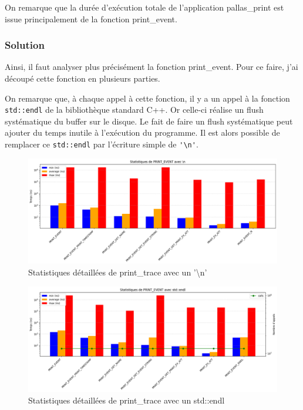 On remarque que la durée d'exécution totale de l'application pallas\_print est issue principalement de la fonction print\_event.

\subsubsection{Solution}\label{ssec:pallas_print_sol}

Ainsi, il faut analyser plus précisément la fonction print\_event.
Pour ce faire, j'ai découpé cette fonction en plusieurs parties. 

On remarque que, à chaque appel à cette fonction, il y a un appel à la fonction \verb!std::endl! de la bibliothèque standard C++. Or celle-ci réalise un flush systématique du buffer sur le disque.
Le fait de faire un flush systématique peut ajouter du temps inutile à l'exécution du programme.
Il est alors possible de remplacer ce \verb!std::endl! par l'écriture simple de \verb!'\n'!.


\begin{figure}[!h]
    \centering
    \includegraphics[width=1\textwidth]{img/print_event_n.png}
    \caption{Statistiques détaillées de print\_trace avec un '\textbackslash n'}
    \label{fig:print_event_n}
\end{figure}

\begin{figure}[!h]
    \centering
    \includegraphics[width=1\textwidth]{img/print_event_endl.png}
    \caption{Statistiques détaillées de print\_trace avec un std::endl}
    \label{fig:print_event_endl}
\end{figure}

